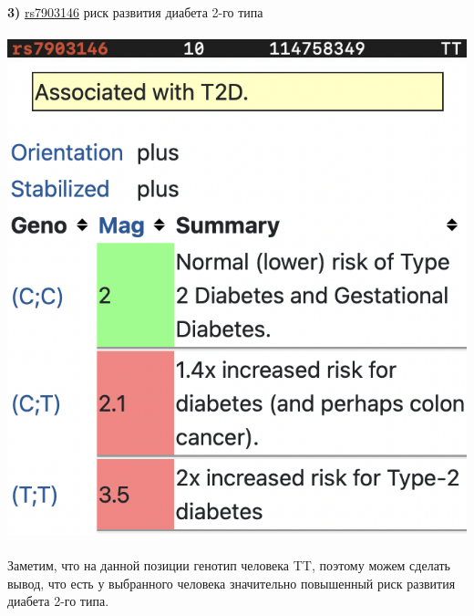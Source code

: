 \documentclass[12pt]{article}
\begin{document}
\textbf{3)} \href{https://www.snpedia.com/index.php/Rs7903146}{rs7903146} риск развития диабета 2-го типа\\\\
\includegraphics[width=\textwidth]{images/image6.png}\\
\includegraphics[width=\textwidth]{images/rs7903146.png}\\\\
Заметим, что на данной позиции генотип человека TT, поэтому можем сделать вывод, что есть у выбранного человека значительно повышенный риск развития диабета 2-го типа.
\newpage
\end{document}
